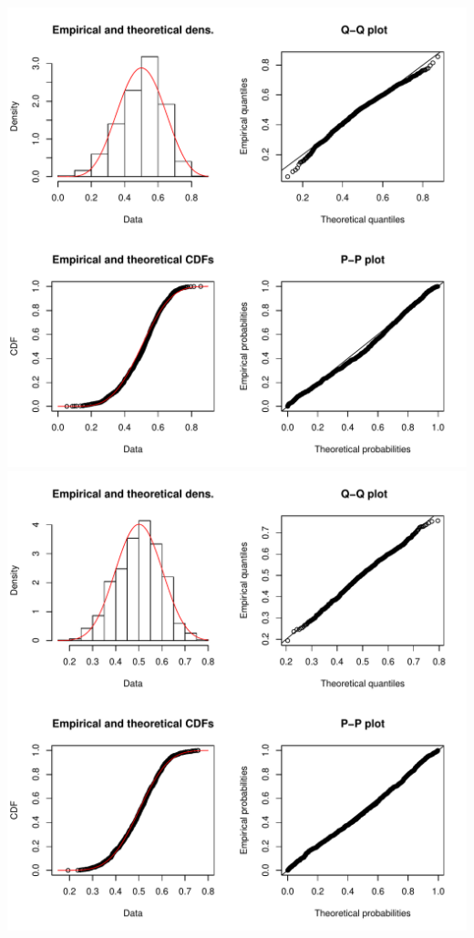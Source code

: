 \documentclass[]{article}
\begin{document}
\includegraphics{2016_w09_files/figure-latex/unnamed-chunk-9-6.pdf}
\includegraphics{2016_w09_files/figure-latex/unnamed-chunk-9-7.pdf}
\end{document}
